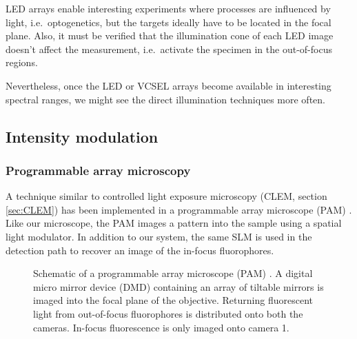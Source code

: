 
LED arrays enable interesting experiments where processes are
influenced by light, i.e.\ optogenetics, but the targets ideally have
to be located in the focal plane. Also, it must be verified that the
illumination cone of each LED image doesn't affect the measurement,
i.e.\ activate the specimen in the out-of-focus regions.

Nevertheless, once the LED or VCSEL arrays become available in
interesting spectral ranges, we might see the direct illumination
techniques more often.

\subsection{Intensity modulation}
\subsubsection{Programmable array microscopy}
A technique similar to controlled light exposure microscopy (CLEM,
section \ref{sec:CLEM}) has been implemented in a programmable array
microscope (PAM) \citep{Caarls2011}. Like our microscope, the PAM
images a pattern into the sample using a spatial light modulator. In
addition to our system, the same SLM is used in the detection path to
recover an image of the in-focus fluorophores.

\begin{figure}[!hbt]
  \centering
  
  \caption{Schematic of a programmable array microscope (PAM)
    \citep[inspired from][]{Verveer1998}. A digital micro mirror
    device (DMD) containing an array of tiltable mirrors is imaged
    into the focal plane of the objective. Returning fluorescent light
    from out-of-focus fluorophores is distributed onto both the
    cameras. In-focus fluorescence is only imaged onto camera 1.}
  \label{fig:pam-sketch}
\end{figure}


%
%
%

